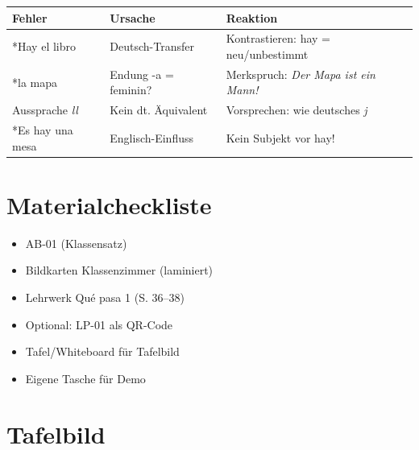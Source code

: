 \documentclass[11pt,a4paper]{article}
\begin{document}
\begin{tabular}{|p{4cm}|p{4cm}|p{5cm}|}
\hline
\textbf{Fehler} & \textbf{Ursache} & \textbf{Reaktion} \\
\hline
*Hay el libro & Deutsch-Transfer & Kontrastieren: hay = neu/unbestimmt \\
\hline
*la mapa & Endung -a = feminin? & Merkspruch: \textit{Der Mapa ist ein Mann!} \\
\hline
Aussprache \textit{ll} & Kein dt. Äquivalent & Vorsprechen: wie deutsches \textit{j} \\
\hline
*Es hay una mesa & Englisch-Einfluss & Kein Subjekt vor hay! \\
\hline
\end{tabular}

\vspace{0.5cm}

\section*{Materialcheckliste}

\begin{itemize}[nosep]
    \item[$\square$] AB-01 (Klassensatz)
    \item[$\square$] Bildkarten Klassenzimmer (laminiert)
    \item[$\square$] Lehrwerk Qué pasa 1 (S. 36--38)
    \item[$\square$] Optional: LP-01 als QR-Code
    \item[$\square$] Tafel/Whiteboard für Tafelbild
    \item[$\square$] Eigene Tasche für Demo
\end{itemize}

\vspace{0.5cm}

\section*{Tafelbild}
\end{document}
